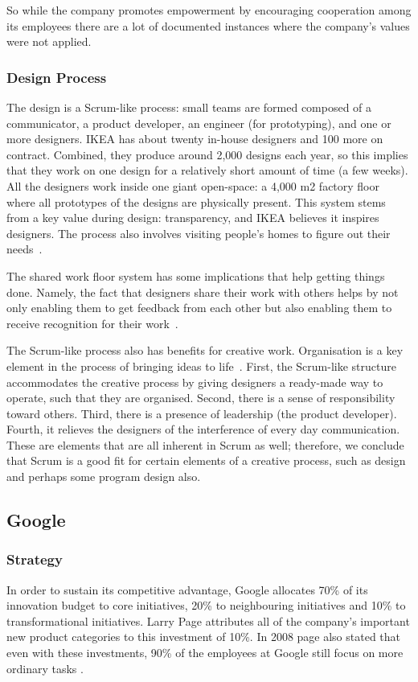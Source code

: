 So while the company promotes empowerment by encouraging cooperation among its employees there are a lot of documented instances where the company's values were not applied.  

\subsubsection{Design Process}
The design is a Scrum-like process: small teams are formed composed of a communicator, a product developer, an engineer (for prototyping), and one or more designers.
IKEA has about twenty in-house designers and 100 more on contract.
Combined, they produce around 2,000 designs each year, so this implies that they work on one design for a relatively short amount of time (a few weeks).
All the designers work inside one giant open-space: a 4,000 m2 factory floor where all prototypes of the designs are physically present.
This system stems from a key value during design: transparency, and IKEA believes it inspires designers.
The process also involves visiting people's homes to figure out their needs~\citep{dezeen2015}.

The shared work floor system has some implications that help getting things done.
Namely, the fact that designers share their work with others helps by not only enabling them to get feedback from each other but also enabling them to receive recognition for their work~\citep{belsky2012}.

The Scrum-like process also has benefits for creative work.
Organisation is a key element in the process of bringing ideas to life~\citep{belsky2012}.
First, the Scrum-like structure accommodates the creative process by giving designers a ready-made way to operate, such that they are organised.
Second, there is a sense of responsibility toward others.
Third, there is a presence of leadership (the product developer).
Fourth, it relieves the designers of the interference of every day communication.
These are elements that are all inherent in Scrum as well; therefore, we conclude that Scrum is a good fit for certain elements of a creative process, such as design and perhaps some program design also.

\subsection{Google}

\subsubsection{Strategy}
In order to sustain its competitive advantage, Google allocates 70\% of its innovation budget to core initiatives, 20\% to neighbouring initiatives and 10\% to transformational initiatives.
Larry Page attributes all of the company's important new product categories to this investment of 10\%.
In 2008 page also stated that even with these investments, 90\% of the employees at Google still focus on more ordinary tasks \citep{Larry64:online}.


